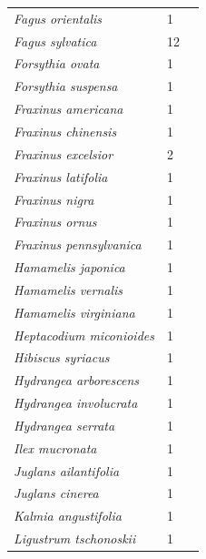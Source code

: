 \documentclass[11pt]{article}
\begin{document}
\begin{longtable}{p{}p{}p{}}
  \emph{Fagus orientalis} &   1 & \emph{\citep{zohner2016}} \\ 
  \emph{Fagus sylvatica} &  12 & \emph{\citep{Basler:2012,Basler:2014aa,Caffarra:2011a,Falusi:1990aa,Falusi:1996aa,Falusi:1997aa,Falusi:2003aa,Heide:1993a,Laube:2014a,malyshev2018,vitra17,zohner2016}} \\ 
  \emph{Forsythia ovata} &   1 & \emph{\citep{zohner2016}} \\ 
  \emph{Forsythia suspensa} &   1 & \emph{\citep{zohner2016}} \\ 
  \emph{Fraxinus americana} &   1 & \emph{\citep{Webb:1977}} \\ 
  \emph{Fraxinus chinensis} &   1 & \emph{\citep{Laube:2014a}} \\ 
  \emph{Fraxinus excelsior} &   2 & \emph{\citep{Basler:2012,Laube:2014a}} \\ 
  \emph{Fraxinus latifolia} &   1 & \emph{\citep{zohner2016}} \\ 
  \emph{Fraxinus nigra} &   1 & \emph{\citep{flynn2018}} \\ 
  \emph{Fraxinus ornus} &   1 & \emph{\citep{zohner2016}} \\ 
  \emph{Fraxinus pennsylvanica} &   1 & \emph{\citep{Laube:2014a}} \\ 
  \emph{Hamamelis japonica} &   1 & \emph{\citep{zohner2016}} \\ 
  \emph{Hamamelis vernalis} &   1 & \emph{\citep{zohner2016}} \\ 
  \emph{Hamamelis virginiana} &   1 & \emph{\citep{flynn2018}} \\ 
  \emph{Heptacodium miconioides} &   1 & \emph{\citep{zohner2016}} \\ 
  \emph{Hibiscus syriacus} &   1 & \emph{\citep{zohner2016}} \\ 
  \emph{Hydrangea arborescens} &   1 & \emph{\citep{zohner2016}} \\ 
  \emph{Hydrangea involucrata} &   1 & \emph{\citep{zohner2016}} \\ 
  \emph{Hydrangea serrata} &   1 & \emph{\citep{zohner2016}} \\ 
  \emph{Ilex mucronata} &   1 & \emph{\citep{flynn2018}} \\ 
  \emph{Juglans ailantifolia} &   1 & \emph{\citep{Laube:2014a}} \\ 
  \emph{Juglans cinerea} &   1 & \emph{\citep{Laube:2014a}} \\ 
  \emph{Kalmia angustifolia} &   1 & \emph{\citep{flynn2018}} \\ 
  \emph{Ligustrum tschonoskii} &   1 & \emph{\citep{zohner2016}} \\ 

\end{longtable}
\end{document}
